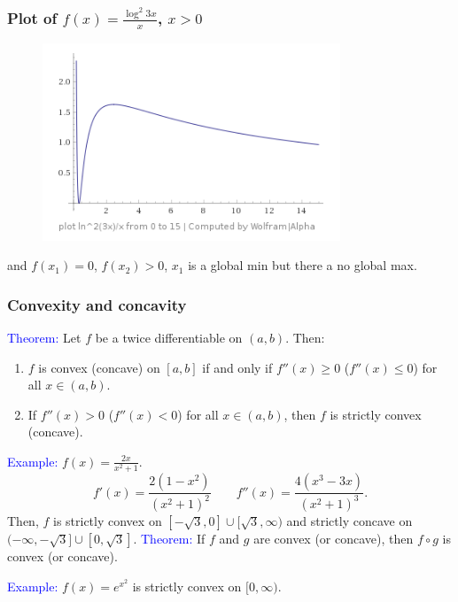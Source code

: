 \documentclass[11pt,aspectratio=169]{beamer}
\begin{document}
\begin{frame}
\frametitle{Plot of $f(x)=\frac{\log^2 3x}{x}$, $x>0$}

\begin{figure}
\includegraphics[width=3.5in]{img/ima} 
\end{figure}
and $f(x_1)=0$, $f(x_2)>0$, $x_1$ is a global min but there a no global max.%
\end{frame}



\begin{frame}
\frametitle{Convexity and concavity}
 \textcolor{blue}{Theorem:} Let $f$ be a twice differentiable on $(a,b)$. Then:
\begin{enumerate}
\item $f$ is convex (concave) on $[a,b]$ if and only if $f''(x)\geq 0$  ($f''(x)\leq 0$) for all $x \in (a,b)$.
\item If $f''(x)> 0$ ($f''(x)< 0$) for all $x \in (a,b)$, then $f$ is strictly convex (concave).
\end{enumerate}



 \textcolor{blue}{Example:} $f(x)=\frac{2x}{x^2+1}$.
$$
f'(x)=\frac{2(1-x^2)}{(x^2+1)^2}\qquad f''(x)=\frac{4(x^3-3x)}{(x^2+1)^3}.
$$
Then, $f$ is strictly convex on $[-\sqrt{3},0] \cup [\sqrt{3}, \infty)$ and strictly concave on $(-\infty, -\sqrt{3}] \cup [0, \sqrt{3}]$.
 \vskip 11pt
 \textcolor{blue}{Theorem:} If $f$ and $g$ are convex (or concave), then $f \circ g$ is convex (or concave).
 
\textcolor{blue}{Example:} $f(x)=e^{x^2}$ is strictly convex on $[0, \infty)$.

\end{frame}
\end{document}
